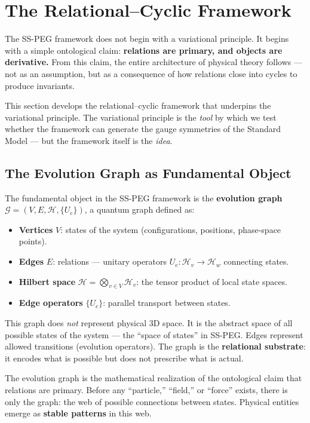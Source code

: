 \section{The Relational--Cyclic Framework}\label{sec:relational_framework}

The SS-PEG framework does not begin with a variational principle. It begins with a simple ontological claim: \textbf{relations are primary, and objects are derivative.} From this claim, the entire architecture of physical theory follows --- not as an assumption, but as a consequence of how relations close into cycles to produce invariants.

This section develops the relational--cyclic framework that underpins the variational principle. The variational principle is the \textit{tool} by which we test whether the framework can generate the gauge symmetries of the Standard Model --- but the framework itself is the \textit{idea}.

\subsection{The Evolution Graph as Fundamental Object}\label{sec:evolution_graph}

The fundamental object in the SS-PEG framework is the \textbf{evolution graph} $\mathcal{G} = (V, E, \mathcal{H}, \{U_e\})$, a quantum graph defined as:

\begin{itemize}
\item \textbf{Vertices} $V$: states of the system (configurations, positions, phase-space points).
\item \textbf{Edges} $E$: relations --- unitary operators $U_e: \mathcal{H}_v \to \mathcal{H}_w$ connecting states.
\item \textbf{Hilbert space} $\mathcal{H} = \bigotimes_{v \in V} \mathcal{H}_v$: the tensor product of local state spaces.
\item \textbf{Edge operators} $\{U_e\}$: parallel transport between states.
\end{itemize}

This graph does \textit{not} represent physical 3D space. It is the abstract space of all possible states of the system --- the ``space of states'' in SS-PEG. Edges represent allowed transitions (evolution operators). The graph is the \textbf{relational substrate}: it encodes what is possible but does not prescribe what is actual.

The evolution graph is the mathematical realization of the ontological claim that relations are primary. Before any ``particle,'' ``field,'' or ``force'' exists, there is only the graph: the web of possible connections between states. Physical entities emerge as \textbf{stable patterns} in this web.

